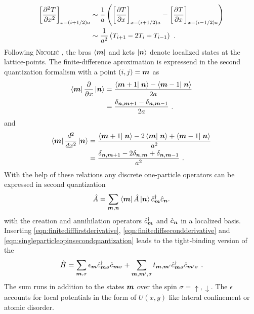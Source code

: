 \begin{align}
  \left[\frac{\partial^2 T}{\partial x^2}\right]_{x=(i+1/2)a} &\sim \frac{1}{a}\left( \left[\frac{\partial T}{\partial x}\right]_{x=(i+1/2)a}-\left[\frac{\partial T}{\partial x}\right]_{x=(i-1/2)a} \right) \notag \\
  &\sim \frac{1}{a^2}\left(T_{i+1}-2T_{i}+T_{i-1}\right)\ .
  \label{ApproximateSecondDerivative}
\end{align}
Following \textsc{Nicoli\'c} \cite{Nikolic2010}, the bras $\left< \boldsymbol{m} \right|$ and kets $\left| \boldsymbol{n} \right>$ denote localized states at the lattice-points. The finite-difference aproximation is  expressend in the second quantization formalism with a point $(i,j) = \boldsymbol{m}$ as
\begin{align}
	\bra{\v{m}} \pd{}{x} \ket{\v{n}} &= \frac{\braket{\v{m}+1}{\v{n}}-\braket{\v{m}-1}{\v{n}}}{2a}\notag\\ 
				&= \frac{\delta_{\v{n},\v{m}+1}-\delta_{\v{n},\v{m}-1}}{2a}\ .
	\label{eqn:finitedifffirstderivative}
\end{align}
and
\begin{align}
	\bra{\v{m}} \dd{}{x} \ket{\v{n}} &= \frac{\braket{\v{m}+1}{\v{n}}-2\braket{\v{m}}{\v{n}}+\braket{\v{m}-1}{\v{n}}}{a^2} \\
				 &= \frac{\delta_{\v{n},\v{m}+1}-2\delta_{\v{n},\v{m}}+\delta_{\v{n},\v{m}-1}}{a^2}\ .
	\label{eqn:finitediffsecondderivative}
\end{align}
With the help of these relations any discrete one-particle operators can be expressed in second quantization
\begin{align}
	\hat{A} = \sum_{\boldsymbol{m},\boldsymbol{n}} \left< \boldsymbol{m} \right|\hat{A}\left| \boldsymbol{n} \right> \hat{c}^{\dagger}_{\boldsymbol{m}} \hat{c}_{\boldsymbol{n}}.
 \label{eqn:singleparticleopinsecondquantization}
\end{align}
with the creation and annihilation operators $\hat{c}^{\dagger}_{\boldsymbol{m}}$ and $\hat{c}_{\boldsymbol{n}}$ in a localized basis.
Inserting \cref{eqn:finitedifffirstderivative}, \ref{eqn:finitediffsecondderivative} and \ref{eqn:singleparticleopinsecondquantization} leads to the tight-binding version of the \hamil{}
\begin{align}
	\hat{H} = \sum_{\boldsymbol{m},\sigma} \epsilon_{\boldsymbol{m}} \hat{c}^{\dagger}_{\boldsymbol{m}\sigma} \hat{c}_{\boldsymbol{m}\sigma} +
	\sum_{\boldsymbol{m},\boldsymbol{m}',\sigma} t_{\boldsymbol{m},\boldsymbol{m}'} \hat{c}^{\dagger}_{\boldsymbol{m}\sigma} \hat{c}_{\boldsymbol{m}'\sigma}\ .
	\label{eqn:discretizedeffectivemassHamil}
\end{align}
The sum runs in addition to the states $\boldsymbol{m}$ over the spin $\sigma=\uparrow,\downarrow$. The $\epsilon$ accounts for local potentials in the form of $U(x,y)$ like lateral confinement or atomic disorder.
